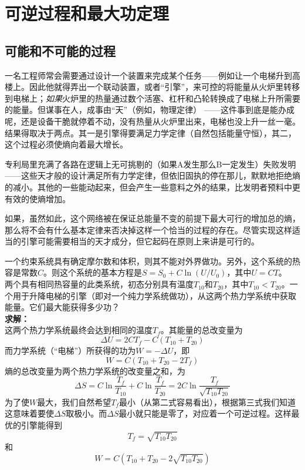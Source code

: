 
\chapter{可逆过程和最大功定理}\label{chap4}

\section{可能和不可能的过程}\label{sec4.1}

一名工程师常会需要通过设计一个装置来完成某个任务——例如让一个电梯升到高楼上。因此他就得弄出一个联动装置，或者“引擎”，来可控的将能量从火炉里转移到电梯上；{\it 如果}火炉里的热量通过数个活塞、杠杆和凸轮转换成了电梯上升所需要的能量。但谋事在人，成事由“天”（例如，物理定律）%
%
——这件事到底是能办成呢，还是设备干脆就停着不动，没有热量从火炉里出来，电梯也没上升一丝一毫。结果得取决于两点。其一是引擎得要满足力学定律（自然包括能量守恒），其二，这个过程必须使熵向着最大增长。

专利局里充满了各路在逻辑上无可挑剔的（如果A发生那么B一定发生）失败发明——这些天才般的设计满足所有力学定律，但依旧固执的停在那儿，默默地拒绝熵的减小。其他的一些能动起来，但会产生一些意料之外的结果，比发明者预料中更有效的使熵增加。

如果，虽然如此，这个网络被在保证总能量不变的前提下最大可行的增加总的熵，那么将不会有什么基本定律来否决掉这样一个恰当的过程的存在。尽管实现这样适当的引擎可能需要相当的天才成分，但它起码在原则上来讲是可行的。

\begin{example}\label{eg4.1}
一个约束系统具有确定摩尔数和体积，则其不能对外界做功。另外，这个系统的热容是常数$C$。则这个系统的基本方程是$S=S_0+C\ln(U/U_0)$，其中$U=CT$。\\
两个具有相同热容量的此类系统，初态分别具有温度$T_{10}$和$T_{20}$，其中$T_{10}<T_{20}$。一个用于升降电梯的引擎（即对一个纯力学系统做功），从这两个热力学系统中获取能量。它们最大能获得多少功？\\
{\bf 求解：}\\
这两个热力学系统最终会达到相同的温度$T_f$。其能量的总改变量为
\[
\Delta U = 2CT_f-C(T_{10}+T_{20})
\]
而力学系统（“电梯”）所获得的功为$W=-\Delta U$，即
\[
W = C(T_{10}+T_{20}-2T_f)
\]
熵的总改变量为两个热力学系统的改变量之和，为
\[
\Delta S = C\ln\frac{T_f}{T_{10}} + C\ln\frac{T_f}{T_{20}} = 2C\ln\frac{T_f}{\sqrt{T_{10}T_{20}}}
\]
为了使$W$最大，我们自然希望$T_f$最小（从第二式容易看出），根据第三式我们知道这意味着要使$\Delta S$取极小。而$\Delta S$最小就只能是零了，对应着一个可逆过程。这样最优的引擎能得到
\[
T_f = \sqrt{T_{10}T_{20}}
\]
和
\[
W = C(T_{10}+T_{20}-2\sqrt{T_{10}T_{20}})
\]
\end{example}

